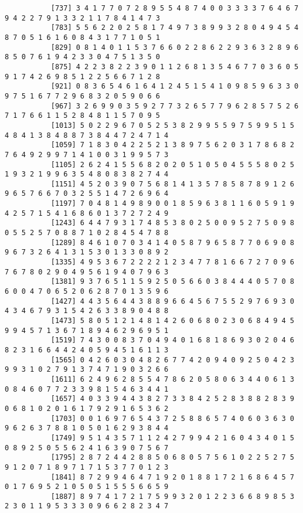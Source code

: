 \documentclass{article}
\begin{document}
\begin{itemize}
\begin{scriptsize}
\begin{verbatim}
		   [737] 3 4 1 7 7 0 7 2 8 9 5 5 4 8 7 4 0 0 3 3 3 3 7 6 4 6 7 9 4 2 2 7 9 1 3 3 2 1 1 7 8 4 1 4 7 3
		   [783] 5 5 6 2 2 0 2 5 8 1 7 4 9 7 3 8 9 9 3 2 8 0 4 9 4 5 4 8 7 0 5 1 6 1 6 0 8 4 3 1 7 7 1 0 5 1
		   [829] 0 8 1 4 0 1 1 5 3 7 6 6 0 2 2 8 6 2 2 9 3 6 3 2 8 9 6 8 5 0 7 6 1 9 4 2 3 3 0 4 7 5 1 3 5 0
		   [875] 4 2 2 3 8 2 2 3 9 0 1 1 2 6 8 1 3 5 4 6 7 7 0 3 6 0 5 9 1 7 4 2 6 9 8 5 1 2 2 5 6 6 7 1 2 8
		   [921] 0 8 3 6 5 4 6 1 6 4 1 2 4 5 1 5 4 1 0 9 8 5 9 6 3 3 0 9 7 5 1 6 7 7 2 9 6 8 3 2 0 5 9 0 6 6
		   [967] 3 2 6 9 9 0 3 5 9 2 7 7 3 2 6 5 7 7 9 6 2 8 5 7 5 2 6 7 1 7 6 6 1 1 5 2 8 4 8 1 1 5 7 0 9 5
		   [1013] 5 0 2 2 9 6 7 0 5 2 5 3 8 2 9 9 5 5 9 7 5 9 9 5 1 5 4 8 4 1 3 8 4 8 8 7 3 8 4 4 7 2 4 7 1 4
		   [1059] 7 1 8 3 0 4 2 2 5 2 1 3 8 9 7 5 6 2 0 3 1 7 8 6 8 2 7 6 4 9 2 9 9 7 1 4 1 0 0 3 1 9 9 5 7 3
		   [1105] 2 6 2 4 1 5 5 6 8 2 0 2 0 5 1 0 5 0 4 5 5 5 8 0 2 5 1 9 3 2 1 9 9 6 3 5 4 8 0 8 3 8 2 7 4 4
		   [1151] 4 5 2 0 3 9 0 7 5 6 8 1 4 1 3 5 7 8 5 8 7 8 9 1 2 6 9 6 5 7 6 6 7 0 3 2 5 5 1 4 7 2 6 9 6 4
		   [1197] 7 0 4 8 1 4 9 8 9 0 0 1 8 5 9 6 3 8 1 1 6 0 5 9 1 9 4 2 5 7 1 5 4 1 6 8 6 0 1 3 7 2 7 2 4 9
		   [1243] 6 4 4 7 9 3 1 7 4 8 5 3 8 0 2 5 0 0 9 5 2 7 5 0 9 8 0 5 5 2 5 7 0 8 8 7 1 0 2 8 4 5 4 7 8 8
		   [1289] 8 4 6 1 0 7 0 3 4 1 4 0 5 8 7 9 6 5 8 7 7 0 6 9 0 8 9 6 7 3 2 6 4 1 3 1 5 3 0 1 3 3 0 8 9 2
		   [1335] 4 9 5 3 6 7 2 2 2 2 1 2 3 4 7 7 8 1 6 6 7 2 7 0 9 6 7 6 7 8 0 2 9 0 4 9 5 6 1 9 4 0 7 9 6 3
		   [1381] 9 3 7 6 5 1 1 5 9 2 5 0 5 6 6 0 3 8 4 4 4 0 5 7 0 8 6 0 0 4 7 0 6 5 2 0 6 2 8 7 0 1 3 5 9 6
		   [1427] 4 4 3 5 6 4 4 3 8 8 9 6 6 4 5 6 7 5 5 2 9 7 6 9 3 0 4 3 4 6 7 9 3 1 5 4 2 6 3 3 8 9 0 4 8 8
		   [1473] 5 8 0 5 1 2 1 4 8 1 4 2 6 0 6 8 0 2 3 0 6 8 4 9 4 5 9 9 4 5 7 1 3 6 7 1 8 9 4 6 2 9 6 9 5 1
		   [1519] 7 4 3 0 0 8 3 7 0 4 9 4 0 1 6 8 1 8 6 9 3 0 2 0 4 6 8 2 3 1 6 6 4 4 2 4 0 5 9 4 5 1 6 1 1 3
		   [1565] 0 4 2 6 0 3 0 4 8 2 6 7 7 4 2 0 9 4 0 9 2 5 0 4 2 3 9 9 3 1 0 2 7 9 1 3 7 4 7 1 9 0 3 2 6 6
		   [1611] 6 2 4 9 6 2 8 5 5 4 7 8 6 2 0 5 8 0 6 3 4 4 0 6 1 3 0 8 4 6 0 7 7 2 3 3 9 8 1 5 4 6 3 4 4 1
		   [1657] 4 0 3 3 9 4 4 3 8 2 7 3 3 8 4 2 5 2 8 3 8 8 2 8 3 9 0 6 8 1 0 2 0 1 6 1 7 9 2 9 1 6 5 3 6 2
		   [1703] 0 0 1 6 9 7 6 5 4 3 7 2 5 8 8 6 5 7 4 0 6 0 3 6 3 0 9 6 2 6 3 7 8 8 1 0 5 0 1 6 2 9 3 8 4 4
		   [1749] 9 5 1 4 3 5 7 1 1 2 4 2 7 9 9 4 2 1 6 0 4 3 4 0 1 5 0 8 9 2 5 0 5 5 6 2 4 1 6 3 9 0 7 5 6 7
		   [1795] 2 8 7 2 4 4 2 8 8 5 0 6 8 0 5 7 5 6 1 0 2 2 5 2 7 5 9 1 2 0 7 1 8 9 7 1 7 1 5 3 7 7 0 1 2 3
		   [1841] 8 7 2 9 9 4 6 4 7 1 9 2 0 1 8 8 1 7 2 1 6 8 6 4 5 7 0 1 7 6 9 5 2 1 0 5 0 5 1 5 5 5 6 6 5 9
		   [1887] 8 9 7 4 1 7 2 1 7 5 9 9 3 2 0 1 2 2 3 6 6 8 9 8 5 3 2 3 0 1 1 9 5 3 3 3 0 9 6 6 2 8 2 3 4 7

\end{verbatim}
\end{scriptsize}
\end{itemize}
\end{document}
